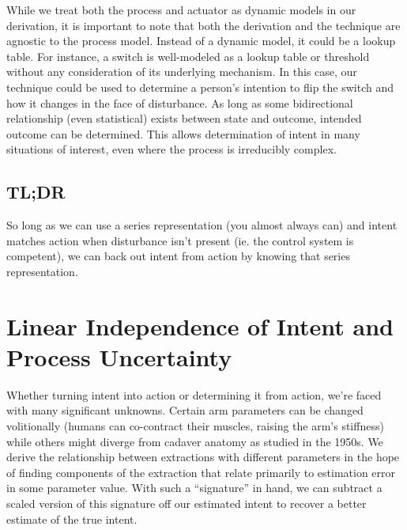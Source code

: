 \documentclass[10pt]{article}
\begin{document}
While we treat both the process and actuator as dynamic models in our derivation, it is important to note that both the derivation and the technique are agnostic to the process model. Instead of a dynamic model, it could be a lookup table. For instance, a switch is well-modeled as a lookup table or threshold without any consideration of its underlying mechanism. In this case, our technique could be used to determine a person's intention to flip the switch and how it changes in the face of disturbance. As long as some bidirectional relationship (even statistical) exists between state and outcome, intended outcome can be determined. This allows determination of intent in many situations of interest, even where the process is irreducibly complex.

\subsection*{TL;DR}
So long as we can use a series representation (you almost always can) and intent matches action when disturbance isn't present (ie. the control system is competent), we can back out intent from action by knowing that series representation.

\section*{Linear Independence of Intent and Process Uncertainty}
Whether turning intent into action or determining it from action, we're faced with many significant unknowns. Certain arm parameters can be changed volitionally (humans can co-contract their muscles, raising the arm's stiffness) while others might diverge from cadaver anatomy as studied in the 1950s. We derive the relationship between extractions with different parameters in the hope of finding components of the extraction that relate primarily to estimation error in some parameter value. With such a ``signature'' in hand, we can subtract a scaled version of this signature off our estimated intent to recover a better estimate of the true intent.
\end{document}
